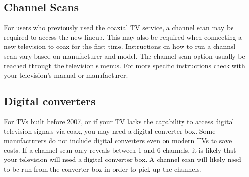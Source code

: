 \documentclass[a4paper, 11pt]{article}
\begin{document}
\subsection*{Channel Scans}
For users who previously used the coaxial TV service, a channel scan may be required to access the new lineup. This may also be required when connecting a new television to coax for the first time. Instructions on how to run a channel scan vary based on manufacturer and model. The channel scan option usually be reached through the television’s menus. For more specific instructions check with your television’s manual or manufacturer.

\subsection*{Digital converters}
For TVs built before 2007, or if your TV lacks the capability to access digital television signals via coax, you may need a digital converter box. Some manufacturers do not include digital converters even on modern TVs to save costs. If a channel scan only reveals between 1 and 6 channels, it is likely that your television will need a digital converter box. A channel scan will likely need to be run from the converter box in order to pick up the channels. 
\end{document}
